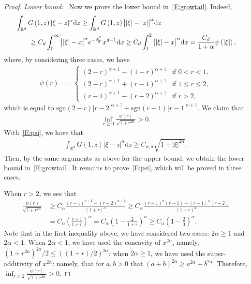 \documentclass[a4paper,11pt]{article}%
\theoremstyle{plain}
\theoremstyle{definition}
\numberwithin{equation}{section}
\newcommand{\R}{\mathbb{R}}
\newcommand{\ud}{\ensuremath{\mathrm{d}}}
\begin{document}
\begin{proof}
  \noindent\textit{Lower bound:~} Now we prove the lower bound in~\eqref{E:growtail}. Indeed,
  \begin{align*}
    \MoveEqLeft \int_{\R^d}G\left(1,z\right) |\xi-z|^\alpha \ud z
      \ge \int_{\R^d}G\left(1,z\right) \big| |\xi| - |z| \big|^\alpha \ud z \\
    & \ge {C_d} \int_0^\infty \big| |\xi| - x \big|^\alpha e^{-\frac{x^2}{2}}x^{d-1}\ud x
      \ge C_d \int_1^2 \big| |\xi| - x \big|^\alpha \ud x
      = \frac{C_d}{1+\alpha} \psi\left(|\xi|\right),
  \end{align*}
  where, by considering three cases, we have
  \begin{align*}
    \psi(r)
    & =
    \begin{cases}
      (2-r)^{\alpha+1} - (1-r)^{\alpha+1} & \text{if $0<r<1$},        \\
      (2-r)^{\alpha+1} + (r-1)^{\alpha+1} & \text{if $1\le r \le 2$}, \\
      (r-1)^{\alpha+1} - (r-2)^{\alpha+1} & \text{if $r > 2$},
    \end{cases}
  \end{align*}
  which is equal to $\text{sgn}(2-r)|r-2|^{\alpha+1} + \text{sgn}(r-1)|r-1|^{\alpha+1}$.
  We claim that
  \begin{align}\label{E:psi}
    \inf_{r\ge 0} \frac{\psi(r)}{\sqrt{1+r^{2\alpha}}}>0.
  \end{align}
  With~\eqref{E:psi}, we have that
  \begin{align*}
    \int_{\R^d}G\left(1,z\right) |\xi-z|^\alpha \ud z \ge C_{\alpha, d} \sqrt{1+|\xi|^{2\alpha}}.
  \end{align*}
  Then, by the same arguments as above for the upper bound, we obtain the lower bound
  in~\eqref{E:growtail}. It remains to prove~\eqref{E:psi}, which will be proved in three cases.

  When $r>2$, we see that
  \begin{align*}
    \frac{\psi(r)}{\sqrt{1+r^{2\alpha}}}
    & \ge C_\alpha \frac{(r-1)^{\alpha+1}-(r-2)^{\alpha+1}}{(1+r)^\alpha}
      \ge C_\alpha \frac{(r-1)^{\alpha}(r-1)-(r-1)^{\alpha}(r-2)}{(1+r)^\alpha} \\
    & = C_\alpha \left(\frac{r-1}{1+r}\right)^\alpha
      = C_\alpha \left(1-\frac{2}{1+r}\right)^\alpha \ge C_\alpha \left(1-\frac{2}{3}\right)^\alpha.
  \end{align*}
  Note that in the first inequality above, we have considered two cases: $2\alpha \ge 1$ and $2
  \alpha < 1$. When $2\alpha < 1$, we have used the concavity of $x^{2\alpha}$, namely, $ (1 +
  r^{2\alpha})^{2\alpha} / 2 \le ((1+r)/2)^{2\alpha}$; when $2\alpha \ge 1$, we have used the
  super-additivity of $x^{2\alpha}$: namely, that for $a,b>0$ that $ (a+b)^{2\alpha}\ge a^{2\alpha}
  + b^{2\alpha}$. Therefore, $\inf_{r>2} \frac{\psi(r)}{\sqrt{1+r^{2\alpha}}} >0$.


\end{proof}
\end{document}
